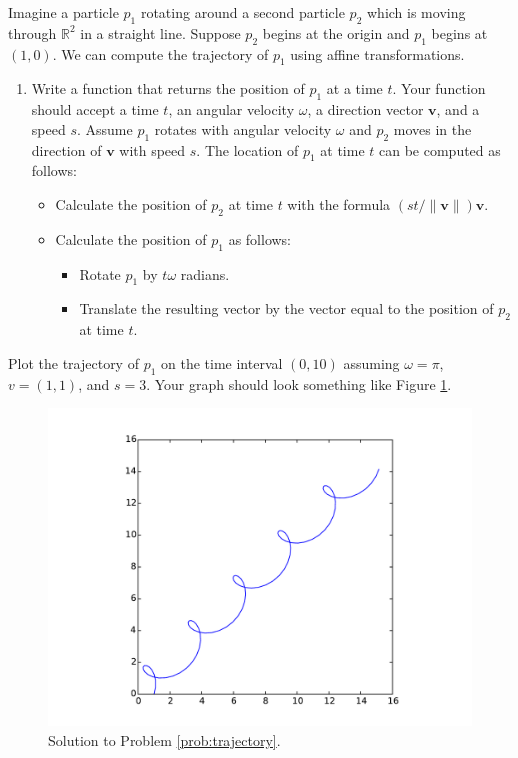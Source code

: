 \begin{problem}
Imagine a particle $p_1$ rotating around a second particle $p_2$ which is moving through $\mathbb{R}^2$ in a straight line. 
Suppose $p_2$ begins at the origin and $p_1$ begins at $(1, 0)$. 
We can compute the trajectory of $p_1$ using affine transformations.

\begin{enumerate}\label{prob:trajectory}
\item Write a function that returns the position of $p_1$ at a time $t$. 
Your function should accept a time $t$, an angular velocity $\omega$, a direction vector $\mathbf{v}$, and a speed $s$. 
Assume $p_1$ rotates with angular velocity $\omega$ and $p_2$ moves in the direction of $\mathbf{v}$ with speed $s$.
The location of $p_1$ at time $t$ can be computed as follows:
\begin{itemize}
\item Calculate the position of $p_2$ at time $t$ with the formula $(st/\|\mathbf{v}\|) \mathbf{v}$.
\item Calculate the position of $p_1$ as follows:
\begin{itemize}
\item Rotate $p_1$ by $t\omega$ radians.
\item Translate the resulting vector by the vector equal to the position of $p_2$ at time $t$.
\end{itemize}
\end{itemize}
\end{enumerate}
\item Plot the trajectory of $p_1$ on the time interval $(0, 10)$ assuming $\omega=\pi$, $v=(1, 1)$, and $s=3$. 
Your graph should look something like Figure \ref{fig:trajectory}.
\begin{figure}[H]
\includegraphics[width=\textwidth]{trajectory.pdf}
\caption{Solution to Problem \ref{prob:trajectory}.}
\label{fig:trajectory} 
\end{figure}
\end{problem}
